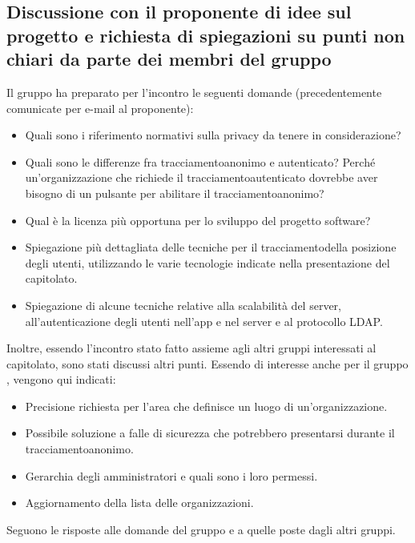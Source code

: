 \subsection{Discussione con il proponente di idee sul progetto \NomeProgetto{} e richiesta di spiegazioni su punti non chiari da parte dei membri del gruppo}
Il gruppo ha preparato per l'incontro le seguenti domande (precedentemente comunicate per e-mail al proponente):
\begin{itemize}
	\item Quali sono i riferimento normativi sulla privacy da tenere in considerazione?
	\item Quali sono le differenze fra tracciamentoanonimo e autenticato? Perché un'organizzazione che richiede il tracciamentoautenticato dovrebbe aver bisogno di un pulsante per abilitare il tracciamentoanonimo?
	\item Qual è la licenza più opportuna per lo sviluppo del progetto software?
	\item Spiegazione più dettagliata delle tecniche per il tracciamentodella posizione degli utenti, utilizzando le varie tecnologie indicate nella presentazione del capitolato.
	\item Spiegazione di alcune tecniche relative alla scalabilità del server, all'autenticazione degli utenti nell'app e nel server e al protocollo LDAP.
\end{itemize}
Inoltre, essendo l'incontro stato fatto assieme agli altri gruppi interessati al capitolato, sono stati discussi altri punti. Essendo di interesse anche per il gruppo \Gruppo{}, vengono qui indicati:
\begin{itemize}
	\item Precisione richiesta per l'area che definisce un luogo di un'organizzazione.
	\item Possibile soluzione a falle di sicurezza che potrebbero presentarsi durante il tracciamentoanonimo.
	\item Gerarchia degli amministratori e quali sono i loro permessi.
	\item Aggiornamento della lista delle organizzazioni.
\end{itemize}
Seguono le risposte alle domande del gruppo e a quelle poste dagli altri gruppi.

